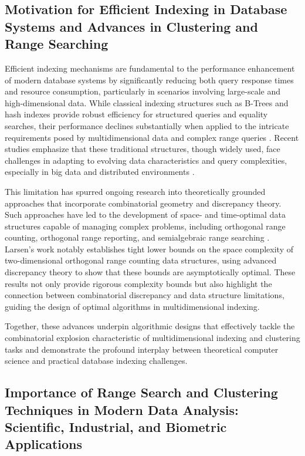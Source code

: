 \documentclass[sigconf]{acmart}
\begin{document}
\subsection{Motivation for Efficient Indexing in Database Systems and Advances in Clustering and Range Searching}

Efficient indexing mechanisms are fundamental to the performance enhancement of modern database systems by significantly reducing both query response times and resource consumption, particularly in scenarios involving large-scale and high-dimensional data. While classical indexing structures such as B-Trees and hash indexes provide robust efficiency for structured queries and equality searches, their performance declines substantially when applied to the intricate requirements posed by multidimensional data and complex range queries \cite{ref31}. Recent studies emphasize that these traditional structures, though widely used, face challenges in adapting to evolving data characteristics and query complexities, especially in big data and distributed environments \cite{ref31}.

This limitation has spurred ongoing research into theoretically grounded approaches that incorporate combinatorial geometry and discrepancy theory. Such approaches have led to the development of space- and time-optimal data structures capable of managing complex problems, including orthogonal range counting, orthogonal range reporting, and semialgebraic range searching \cite{ref1}. Larsen's work \cite{ref1} notably establishes tight lower bounds on the space complexity of two-dimensional orthogonal range counting data structures, using advanced discrepancy theory to show that these bounds are asymptotically optimal. These results not only provide rigorous complexity bounds but also highlight the connection between combinatorial discrepancy and data structure limitations, guiding the design of optimal algorithms in multidimensional indexing.

Together, these advances underpin algorithmic designs that effectively tackle the combinatorial explosion characteristic of multidimensional indexing and clustering tasks and demonstrate the profound interplay between theoretical computer science and practical database indexing challenges.

\subsection{Importance of Range Search and Clustering Techniques in Modern Data Analysis: Scientific, Industrial, and Biometric Applications}
\end{document}
